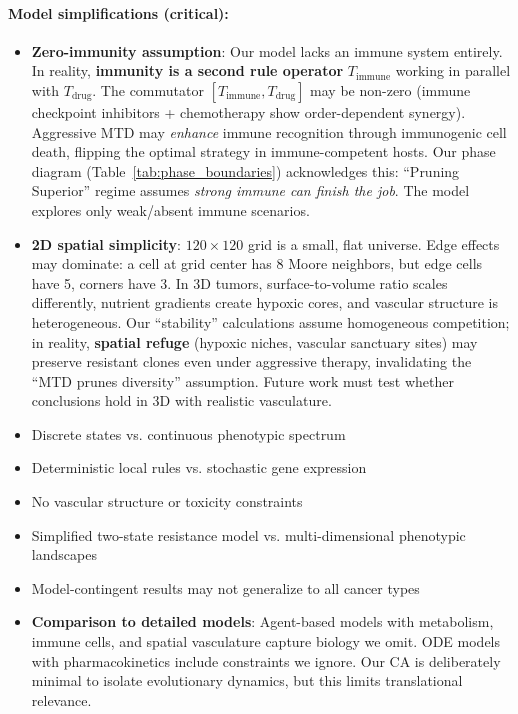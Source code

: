 \documentclass[11pt,a4paper]{article}
\begin{document}
\paragraph{Model simplifications (critical):}
\begin{itemize}
    \item \textbf{Zero-immunity assumption}: Our model lacks an immune system entirely. In reality, \textbf{immunity is a second rule operator} $T_{\text{immune}}$ working in parallel with $T_{\text{drug}}$. The commutator $[T_{\text{immune}}, T_{\text{drug}}]$ may be non-zero (immune checkpoint inhibitors + chemotherapy show order-dependent synergy). Aggressive MTD may \textit{enhance} immune recognition through immunogenic cell death, flipping the optimal strategy in immune-competent hosts. Our phase diagram (Table~\ref{tab:phase_boundaries}) acknowledges this: ``Pruning Superior'' regime assumes \textit{strong immune can finish the job}. The model explores only weak/absent immune scenarios.
    \item \textbf{2D spatial simplicity}: $120\times120$ grid is a small, flat universe. Edge effects may dominate: a cell at grid center has 8 Moore neighbors, but edge cells have 5, corners have 3. In 3D tumors, surface-to-volume ratio scales differently, nutrient gradients create hypoxic cores, and vascular structure is heterogeneous. Our ``stability'' calculations assume homogeneous competition; in reality, \textbf{spatial refuge} (hypoxic niches, vascular sanctuary sites) may preserve resistant clones even under aggressive therapy, invalidating the ``MTD prunes diversity'' assumption. Future work must test whether conclusions hold in 3D with realistic vasculature.
    \item Discrete states vs. continuous phenotypic spectrum
    \item Deterministic local rules vs. stochastic gene expression
    \item No vascular structure or toxicity constraints
    \item Simplified two-state resistance model vs. multi-dimensional phenotypic landscapes
    \item Model-contingent results may not generalize to all cancer types
    \item \textbf{Comparison to detailed models}: Agent-based models with metabolism, immune cells, and spatial vasculature \citep{anderson2008tumor} capture biology we omit. ODE models with pharmacokinetics \citep{carrere2020stability} include constraints we ignore. Our CA is deliberately minimal to isolate evolutionary dynamics, but this limits translational relevance.
\end{itemize}
\end{document}
